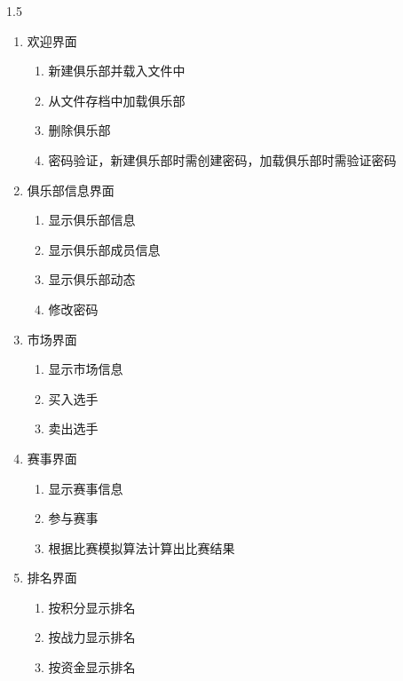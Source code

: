 \documentclass[a4paper]{article}
\begin{document}
\begin{spacing}{1.5}
        \begin{enumerate}
            \item 欢迎界面
                \begin{enumerate}
                    \item 新建俱乐部并载入文件中
                    \item 从文件存档中加载俱乐部
                    \item 删除俱乐部
                    \item 密码验证，新建俱乐部时需创建密码，加载俱乐部时需验证密码
                \end{enumerate}
            \item 俱乐部信息界面
                \begin{enumerate}
                    \item 显示俱乐部信息
                    \item 显示俱乐部成员信息
                    \item 显示俱乐部动态
                    \item 修改密码
                \end{enumerate}
            \item 市场界面
                \begin{enumerate}
                    \item 显示市场信息
                    \item 买入选手
                    \item 卖出选手
                \end{enumerate}
            \item 赛事界面
                \begin{enumerate}
                    \item 显示赛事信息
                    \item 参与赛事
                    \item 根据比赛模拟算法计算出比赛结果
                \end{enumerate}
            \item 排名界面
                \begin{enumerate}
                    \item 按积分显示排名
                    \item 按战力显示排名
                    \item 按资金显示排名
                \end{enumerate}
            

\end{enumerate}
\end{spacing}
\end{document}
